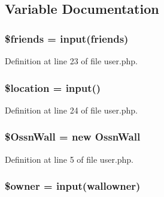 \subsection{Variable Documentation}
\subsubsection[{\texorpdfstring{\$friends}{$friends}}]{\setlength{\rightskip}{0pt plus 5cm}\$friends = {\bf input}(\textquotesingle{}friends\textquotesingle{})}\hypertarget{user_8php_afb66104a0d5a5b286634a265d216b8d6}{}\label{user_8php_afb66104a0d5a5b286634a265d216b8d6}


Definition at line 23 of file user.\+php.

\subsubsection[{\texorpdfstring{\$location}{$location}}]{\setlength{\rightskip}{0pt plus 5cm}\${\bf location} = {\bf input}(\textquotesingle{})}\hypertarget{user_8php_ac319193077976bb217112e5a7b7b8022}{}\label{user_8php_ac319193077976bb217112e5a7b7b8022}


Definition at line 24 of file user.\+php.

\subsubsection[{\texorpdfstring{\$\+Ossn\+Wall}{$OssnWall}}]{\setlength{\rightskip}{0pt plus 5cm}\${\bf Ossn\+Wall} = new {\bf Ossn\+Wall}}\hypertarget{user_8php_a3fe8a689739786120fddd91dedeb172b}{}\label{user_8php_a3fe8a689739786120fddd91dedeb172b}


Definition at line 5 of file user.\+php.

\subsubsection[{\texorpdfstring{\$owner}{$owner}}]{\setlength{\rightskip}{0pt plus 5cm}\$owner = {\bf input}(\textquotesingle{}wallowner\textquotesingle{})}\hypertarget{user_8php_a9aabf46bdb166877480b2094d7ca01a7}{}\label{user_8php_a9aabf46bdb166877480b2094d7ca01a7}


